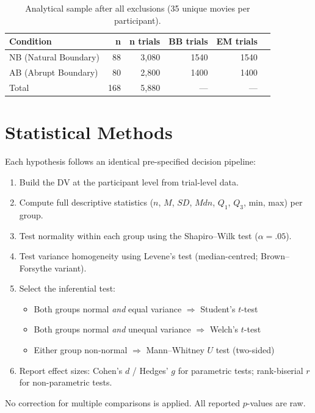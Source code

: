 \documentclass[12pt,a4paper]{article}
\begin{document}
\begin{table}[H]
\centering
\begin{tabular}{lrrrrr}
\hline
\textbf{Condition} & \textbf{n} & \textbf{n trials} & \textbf{BB trials} & \textbf{EM trials} \\
\hline
NB (Natural Boundary) & 88 & 3,080 & 1540 & 1540 \\
AB (Abrupt Boundary)  & 80 & 2,800 & 1400 & 1400 \\
Total & 168 & 5,880 & --- & --- \\
\hline
\end{tabular}
\caption{Analytical sample after all exclusions (35 unique movies per participant).}
\end{table}


\section{Statistical Methods}

Each hypothesis follows an identical pre-specified decision pipeline:
\begin{enumerate}[nosep]
  \item Build the DV at the participant level from trial-level data.
  \item Compute full descriptive statistics ($n$, $M$, $SD$, $Mdn$, $Q_1$, $Q_3$, min, max) per group.
  \item Test normality within each group using the Shapiro--Wilk test ($\alpha = .05$).
  \item Test variance homogeneity using Levene's test (median-centred; Brown--Forsythe variant).
  \item Select the inferential test:
    \begin{itemize}[nosep]
      \item Both groups normal \emph{and} equal variance $\Rightarrow$ Student's $t$-test
      \item Both groups normal \emph{and} unequal variance $\Rightarrow$ Welch's $t$-test
      \item Either group non-normal $\Rightarrow$ Mann--Whitney $U$ test (two-sided)
    \end{itemize}
  \item Report effect sizes: Cohen's $d$ / Hedges' $g$ for parametric tests;
        rank-biserial $r$ for non-parametric tests.
\end{enumerate}
No correction for multiple comparisons is applied. All reported $p$-values are raw.
\end{document}
